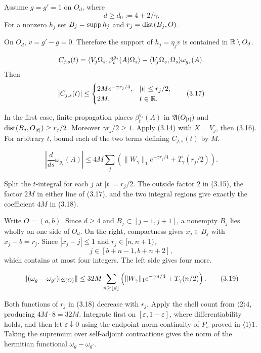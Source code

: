 \documentclass[11pt,a4paper]{article}
\begin{document}
Assume $g=g'=1$ on $O_d$, where
\[
 d\geq d_0:=4+2/\gamma.
\]
For a nonzero $h_j$ set $B_j=\operatorname{supp} h_j$ and $r_j=\operatorname{dist}(B_j,O)$.


\Because On $O_d$, $v=g'-g=0$.  Therefore the support of $h_j=\eta_jv$ is
contained in $\mathbb R\setminus O_d$.

\[
 C_{j,s}(t)=\langle V_j\Omega_s,\beta_t^{g_s}(A)\Omega_s\rangle
 -\langle V_j\Omega_s,\Omega_s\rangle\omega_{g_s}(A).
\]
Then
\[
 |C_{j,s}(t)|\leq
 \begin{cases}
 2Me^{-\gamma r_j/4},&|t|\leq r_j/2,\\
 2M,&t\in\mathbb R.
 \end{cases}                                                       \tag{3.17}
\]

\Because In the first case, finite propagation places
$\beta_t^{g_s}(A)$ in $\mathfrak A(O_{|t|})$ and
$\operatorname{dist}(B_j,O_{|t|})\geq r_j/2$.  Moreover
$\gamma r_j/2\geq1$.  Apply (3.14) with $X=V_j$, then (3.16).
For arbitrary $t$, bound each of the two terms defining $C_{j,s}(t)$ by $M$.

\[
 \left|\frac d{ds}\omega_{g_s}(A)\right|
 \leq4M\sum_j\left(\|W_\gamma\|_1e^{-\gamma r_j/4}
                    +T_\gamma(r_j/2)\right).                      \tag{3.18}
\]

\Because Split the $t$-integral for each $j$ at $|t|=r_j/2$.  The outside
factor $2$ in (3.15), the factor $2M$ in either line of (3.17), and the two
integral regions give exactly the coefficient $4M$ in (3.18).

\LS{2}{4}{At most eight indices $j$ have $r_j\in[n,n+1)$ for any integer
$n\geq\lfloor d\rfloor$.}

\Because Write $O=(a,b)$.  Since $d\geq4$ and
$B_j\subset[j-1,j+1]$, a nonempty $B_j$ lies wholly on one side of $O_d$.
On the right, compactness gives $x_j\in B_j$ with $x_j-b=r_j$.  Since
$|x_j-j|\leq1$ and $r_j\in[n,n+1)$,
\[
 j\in[b+n-1,b+n+2],
\]
which contains at most four integers.  The left side gives four more.

\[
 \|(\omega_g-\omega_{g'})|_{\mathfrak A(O)}\|
 \leq32M\sum_{n\geq\lfloor d\rfloor}
 \left(\|W_\gamma\|_1e^{-\gamma n/4}+T_\gamma(n/2)\right).        \tag{3.19}
\]

\Because Both functions of $r_j$ in (3.18) decrease with $r_j$.  Apply the shell
count from $\langle2\rangle4$, producing $4M\cdot8=32M$.  Integrate first on
$[\varepsilon,1-\varepsilon]$, where differentiability holds, and then let
$\varepsilon\downarrow0$ using the endpoint norm continuity of $P_s$ proved in
$\langle1\rangle1$.  Taking the supremum over self-adjoint contractions gives the
norm of the hermitian functional $\omega_g-\omega_{g'}$.
\end{document}
